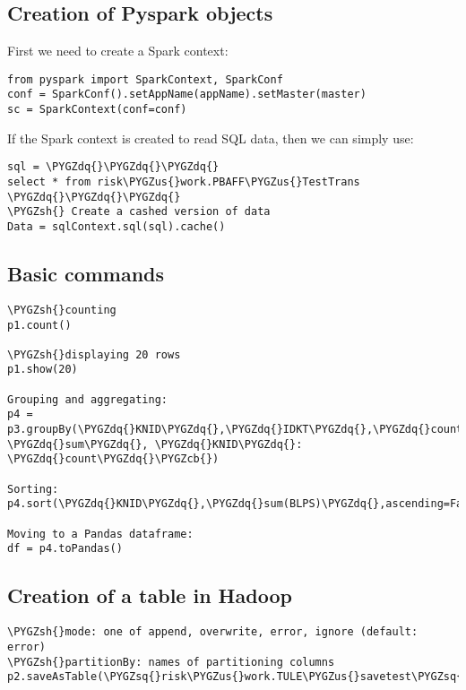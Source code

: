\documentclass[letterpaper,10pt,english]{sphinxmanual}
\def\PYGZus{\char`\_}
\def\PYGZob{\char`\{}
\def\PYGZcb{\char`\}}
\def\PYGZsh{\char`\#}
\def\PYGZsq{\char`\'}
\def\PYGZdq{\char`\"}
\renewcommand\PYGZsq{\textquotesingle}
\begin{document}
\subsection{Creation of Pyspark objects}
\label{Pyspark_Documentation:creation-of-pyspark-objects}
First we need to create a Spark context:

\begin{Verbatim}[commandchars=\\\{\}]
from pyspark import SparkContext, SparkConf
conf = SparkConf().setAppName(appName).setMaster(master)
sc = SparkContext(conf=conf)
\end{Verbatim}

If the Spark context is created to read SQL data, then we can simply use:

\begin{Verbatim}[commandchars=\\\{\}]
sql = \PYGZdq{}\PYGZdq{}\PYGZdq{}
select * from risk\PYGZus{}work.PBAFF\PYGZus{}TestTrans
\PYGZdq{}\PYGZdq{}\PYGZdq{}
\PYGZsh{} Create a cashed version of data
Data = sqlContext.sql(sql).cache()
\end{Verbatim}


\subsection{Basic commands}
\label{Pyspark_Documentation:basic-commands}
\begin{Verbatim}[commandchars=\\\{\}]
\PYGZsh{}counting
p1.count()

\PYGZsh{}displaying 20 rows
p1.show(20)

Grouping and aggregating:
p4 = p3.groupBy(\PYGZdq{}KNID\PYGZdq{},\PYGZdq{}IDKT\PYGZdq{},\PYGZdq{}counter\PYGZus{}account\PYGZdq{}).agg(\PYGZob{}\PYGZdq{}BLPS\PYGZdq{}: \PYGZdq{}sum\PYGZdq{}, \PYGZdq{}KNID\PYGZdq{}: \PYGZdq{}count\PYGZdq{}\PYGZcb{})

Sorting:
p4.sort(\PYGZdq{}KNID\PYGZdq{},\PYGZdq{}sum(BLPS)\PYGZdq{},ascending=False).show(100)

Moving to a Pandas dataframe:
df = p4.toPandas()
\end{Verbatim}


\subsection{Creation of a table in Hadoop}
\label{Pyspark_Documentation:creation-of-a-table-in-hadoop}
\begin{Verbatim}[commandchars=\\\{\}]
\PYGZsh{}mode: one of append, overwrite, error, ignore (default: error)
\PYGZsh{}partitionBy: names of partitioning columns
p2.saveAsTable(\PYGZsq{}risk\PYGZus{}work.TULE\PYGZus{}savetest\PYGZsq{},partitionBy=\PYGZsq{}KNID\PYGZsq{},mode=\PYGZsq{}overwrite\PYGZsq{})
\end{Verbatim}
\end{document}
